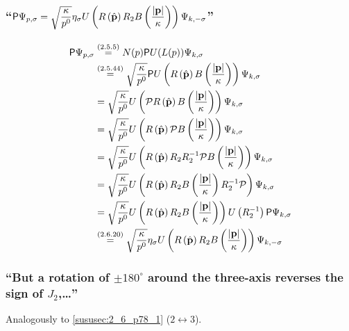 \subsubsection{\enquote{$\mathsf{P}\Psi_{p,\sigma}=\sqrt{\dfrac{\kappa}{p^0}}\eta_\sigma U\left( R\left(\hat{\mathbf{p}}\right)R_2  B\left(\dfrac{\abs{\mathbf{p}}}{\kappa}\right)\right)\Psi_{k,-\sigma}$} }\label{sususec:2_6_p79_1}
\begin{align*} 
	\mathsf{P}\Psi_{p,\sigma}&\overset{({2.5.5})}{=}N(p)\mathsf{P} U(L(p))\Psi_{k,\sigma}\\
	&\overset{({2.5.44})}{=}\sqrt{\dfrac{\kappa}{p^0}}\mathsf{P} U\left(R\left(\hat{\mathbf{p}}\right)B\left(\dfrac{\abs{\mathbf{p}}}{\kappa}\right)\right)\Psi_{k,\sigma}\\
	&=\sqrt{\dfrac{\kappa}{p^0}}U\left(\mathcal{\mathcal{P}} R\left(\hat{\mathbf{p}}\right)B\left(\dfrac{\abs{\mathbf{p}}}{\kappa}\right)\right)\Psi_{k,\sigma}\\
	&=\sqrt{\dfrac{\kappa}{p^0}}U\left( R\left(\hat{\mathbf{p}}\right)\mathcal{\mathcal{P}} B\left(\dfrac{\abs{\mathbf{p}}}{\kappa}\right)\right)\Psi_{k,\sigma}\\
	&=\sqrt{\dfrac{\kappa}{p^0}}U\left( R\left(\hat{\mathbf{p}}\right)R_2 R_2^{-1}\mathcal{\mathcal{P}} B\left(\dfrac{\abs{\mathbf{p}}}{\kappa}\right)\right)\Psi_{k,\sigma}\\
	&=\sqrt{\dfrac{\kappa}{p^0}}U\left( R\left(\hat{\mathbf{p}}\right)R_2  B\left(\dfrac{\abs{\mathbf{p}}}{\kappa}\right)R_2^{-1}\mathcal{\mathcal{P}}\right)\Psi_{k,\sigma}\\
	&=\sqrt{\dfrac{\kappa}{p^0}}U\left( R\left(\hat{\mathbf{p}}\right)R_2  B\left(\dfrac{\abs{\mathbf{p}}}{\kappa}\right)\right)U\left(R_2^{-1}\right)\mathsf{P}\Psi_{k,\sigma}\\
	&\overset{({2.6.20})}{=}\sqrt{\dfrac{\kappa}{p^0}}\eta_\sigma U\left( R\left(\hat{\mathbf{p}}\right)R_2  B\left(\dfrac{\abs{\mathbf{p}}}{\kappa}\right)\right)\Psi_{k,-\sigma}\\
\end{align*}

\subsubsection{\enquote{But a rotation of $\pm180^\circ$ around the three-axis reverses the sign of $J_2$,\dots} }
Analogously to \ref{sususec:2_6_p78_1} ($2\leftrightarrow3$).

